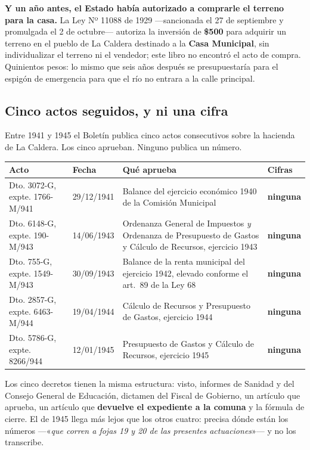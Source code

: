 \textbf{Y un año antes, el Estado había autorizado a comprarle el terreno para la casa.} La Ley Nº 11088 de 1929 ---sancionada el 27 de septiembre y promulgada el 2 de octubre--- autoriza
la inversión de \textbf{\$500} para adquirir un terreno en el pueblo de La Caldera destinado a
la \textbf{Casa Municipal}, sin individualizar el terreno ni el vendedor; este libro no encontró el acto de compra. Quinientos pesos: lo mismo que seis años después se presupuestaría para el espigón
de emergencia para que el río no entrara a la calle principal.

\subsection*{Cinco actos seguidos, y ni una cifra}

Entre 1941 y 1945 el Boletín publica cinco actos consecutivos sobre la hacienda de La
Caldera. Los cinco aprueban. Ninguno publica un número.

{\small
\begin{longtable}{@{}p{3.5cm}p{2.1cm}p{5.0cm}p{2.0cm}@{}}
\toprule
\textbf{Acto} & \textbf{Fecha} & \textbf{Qué aprueba} & \textbf{Cifras} \\
\midrule
\endhead
Dto. 3072-G, expte. 1766-M/941 & 29/12/1941 & Balance del ejercicio económico 1940 de la Comisión Municipal & \textbf{ninguna} \\
Dto. 6148-G, expte. 190-M/943 & 14/06/1943 & Ordenanza General de Impuestos \textit{y} Ordenanza de Presupuesto de Gastos y Cálculo de Recursos, ejercicio 1943 & \textbf{ninguna} \\
Dto. 755-G, expte. 1549-M/943 & 30/09/1943 & Balance de la renta municipal del ejercicio 1942, elevado conforme el art.\ 89 de la Ley 68 & \textbf{ninguna} \\
Dto. 2857-G, expte. 6463-M/944 & 19/04/1944 & Cálculo de Recursos y Presupuesto de Gastos, ejercicio 1944 & \textbf{ninguna} \\
Dto. 5786-G, expte. 8266/944 & 12/01/1945 & Presupuesto de Gastos y Cálculo de Recursos, ejercicio 1945 & \textbf{ninguna} \\
\bottomrule
\end{longtable}}

Los cinco decretos tienen la misma estructura: visto, informes de Sanidad y del Consejo
General de Educación, dictamen del Fiscal de Gobierno, un artículo que aprueba, un artículo
que \textbf{devuelve el expediente a la comuna} y la fórmula de cierre. El de 1945 llega más
lejos que los otros cuatro: precisa dónde están los números ---«\textit{que corren a fojas 19 y
20 de las presentes actuaciones}»--- y no los transcribe.

